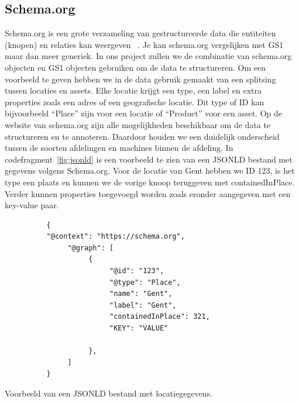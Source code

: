 \subsection{Schema.org}
Schema.org is een grote verzameling van gestructureerde data die entiteiten (knopen) en relaties kan weergeven ~\autocite{Douglas2023}.
Je kan schema.org vergelijken met GS1 maar dan meer generiek. In ons project zullen we de combinatie van schema.org objecten en GS1 objecten gebruiken om de data te structureren.
Om een voorbeeld te geven hebben we in de data gebruik gemaakt van een splitsing tussen locaties en assets.
Elke locatie krijgt een type, een label en extra properties zoals een adres of een geografische locatie.
Dit type of ID kan bijvoorbeeld ``Place'' zijn voor een locatie of ``Product'' voor een asset. 
Op de website van schema.org zijn alle mogelijkheden beschikbaar om de data te structureren en te annoteren.
Daardoor houden we een duidelijk onderscheid tussen de soorten afdelingen en machines binnen de afdeling.
In codefragment~\ref{fig:jsonld} is een voorbeeld te zien van een JSON\-LD bestand met gegevens volgens Schema.org.
Voor de locatie van Gent hebben we ID 123, is het type een plaats en kunnen we de vorige knoop teruggeven met containedInPlace.
Verder kunnen properties toegevoegd worden zoals eronder aangegeven met een key-value paar.
\begin{listing}
     \begin{verbatim}
          {
          "@context": "https://schema.org",
               "@graph": [
                    {
                         "@id": "123",
                         "@type": "Place",
                         "name": "Gent",
                         "label": "Gent",
                         "containedInPlace": 321,
                         "KEY": "VALUE"
                         
                    },
               ]
          }
     \end{verbatim}
     \caption[Voorbeeld JSON\-LD bestand]{\label{fig:jsonld}Voorbeeld van een JSON\-LD bestand met locatiegegevens.}
\end{listing}

